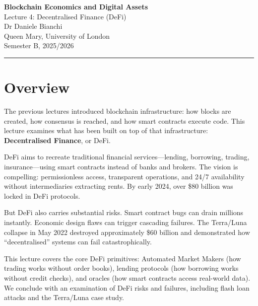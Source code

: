 \documentclass[11pt,a4paper]{article}
\newcommand{\keyword}[1]{\textbf{\textcolor{AccentOrange}{#1}}}
\begin{document}
\begin{center}
    {\LARGE\bfseries\textcolor{ImperialBlue}{Blockchain Economics and Digital Assets}}\\[0.5em]
    {\Large Lecture 4: Decentralised Finance (DeFi)}\\[1em]
    {\large Dr Daniele Bianchi}\\[0.5em]
    {\normalsize Queen Mary, University of London}\\[0.3em]
    {\normalsize Semester B, 2025/2026}
\end{center}

\vspace{1em}
\hrule
\vspace{1em}

\tableofcontents

\vspace{2cm}

\section*{Overview}

The previous lectures introduced blockchain infrastructure: how blocks are created, how consensus is reached, and how smart contracts execute code. This lecture examines what has been built on top of that infrastructure: \keyword{Decentralised Finance}, or DeFi.

DeFi aims to recreate traditional financial services---lending, borrowing, trading, insurance---using smart contracts instead of banks and brokers. The vision is compelling: permissionless access, transparent operations, and 24/7 availability without intermediaries extracting rents. By early 2024, over \$80 billion was locked in DeFi protocols.

But DeFi also carries substantial risks. Smart contract bugs can drain millions instantly. Economic design flaws can trigger cascading failures. The Terra/Luna collapse in May 2022 destroyed approximately \$60 billion and demonstrated how ``decentralised'' systems can fail catastrophically.

This lecture covers the core DeFi primitives: Automated Market Makers (how trading works without order books), lending protocols (how borrowing works without credit checks), and oracles (how smart contracts access real-world data). We conclude with an examination of DeFi risks and failures, including flash loan attacks and the Terra/Luna case study.
\end{document}
